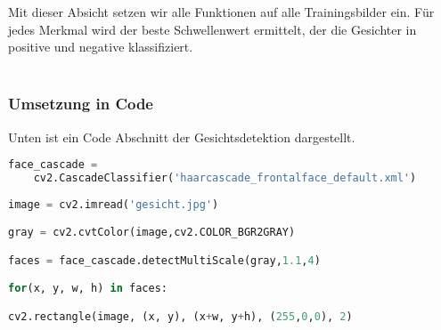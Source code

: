 Mit dieser Absicht setzen wir alle Funktionen auf alle Trainingsbilder ein. Für jedes Merkmal wird der beste Schwellenwert ermittelt, der die Gesichter in positive und negative klassifiziert.\\\\

\subsubsection{Umsetzung in Code}

Unten ist ein Code Abschnitt der Gesichtsdetektion dargestellt. \\

\begin{lstlisting}[language=Python, caption=Kern Code für Gesichtsdetektion,label=detect]
face_cascade = 
	cv2.CascadeClassifier('haarcascade_frontalface_default.xml')
	
image = cv2.imread('gesicht.jpg')

gray = cv2.cvtColor(image,cv2.COLOR_BGR2GRAY)

faces = face_cascade.detectMultiScale(gray,1.1,4)

for(x, y, w, h) in faces:

cv2.rectangle(image, (x, y), (x+w, y+h), (255,0,0), 2) 

\end{lstlisting}

